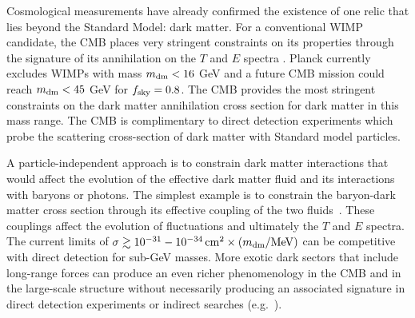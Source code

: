 Cosmological measurements have already confirmed the existence of one relic that lies beyond the 
Standard Model: dark matter. For a conventional WIMP candidate, the CMB places very stringent 
constraints on its properties through the signature of its annihilation on the $T$ and $E$ 
spectra \citep{Peebles2000, Chen2004, Padmanabhan2005}.  Planck currently excludes WIMPs with mass $m_{\rm dm}< 16$ GeV and a future CMB mission could reach $m_{\rm dm} < 45$ GeV for $f_{\rm sky} =0.8$.  The CMB provides the most stringent constraints on the dark matter annihilation cross section for dark matter in this mass range.  The CMB is complimentary to direct detection experiments which probe the scattering cross-section of dark matter with Standard model particles.


A particle-independent approach is to constrain dark matter interactions that would 
affect the evolution of the effective dark matter fluid and its interactions with baryons or photons.  The simplest example is 
to constrain the baryon-dark matter cross section through its effective coupling of the two fluids~\cite{Dvorkin:2013cea}.  
These couplings affect the evolution of fluctuations and ultimately the $T$ and $E$ spectra. The current limits of $\sigma \gtrsim 10^{-31}-10^{-34}\,{\rm cm}^2 \times (m_{\rm dm} / {\rm MeV})$ can be competitive with direct detection for sub-GeV masses.  
More exotic dark sectors that include long-range forces can produce an even richer phenomenology in the CMB and in the large-scale structure 
without necessarily producing an associated signature in direct detection experiments or 
indirect searches (e.g.~\cite{Cyr-Racine:2013fsa,Buen-Abad:2015ova,Lesgourgues:2015wza}). 

